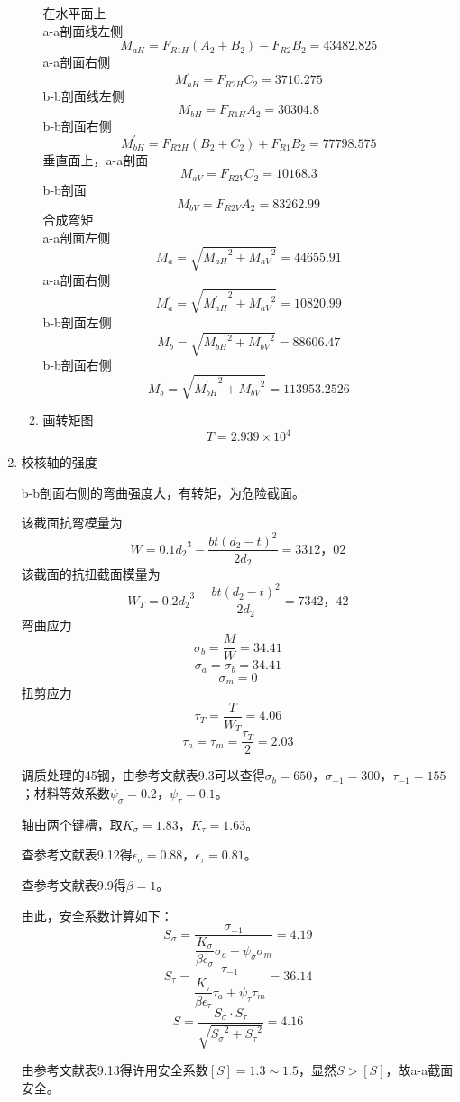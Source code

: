 \begin{enumerate}[A]
\begin{enumerate}[a]
		\par 在水平面上 \\
		a-a剖面线左侧\\
		$$M_{aH}=F_{R1H}\left(A_2+B_2\right)-F_{R2}B_2=43482.825$$
		a-a剖面右侧 \\
		$$M^{\prime}_{aH}=F_{R2H}C_2=3710.275$$
		b-b剖面线左侧\\
		$$M_{bH}=F_{R1H}A_2=30304.8$$
		b-b剖面右侧 \\
		$$M^{\prime}_{bH}=F_{R2H}\left(B_2+C_2\right)+F_{R1}B_2=77798.575$$
		垂直面上，a-a剖面
		$$M_{aV}=F_{R2V}C_2=10168.3$$
		b-b剖面
		$$M_{bV}=F_{R2V}A_2=83262.99$$
		合成弯矩\\
		a-a剖面左侧\\
		$$M_a=\sqrt{{M_{aH}}^2+{M_{aV}}^2}=44655.91$$
		a-a剖面右侧\\
		$$M^{\prime}_a=\sqrt{{M^{\prime}_{aH}}^2+{M_{aV}}^2}=10820.99$$
		b-b剖面左侧\\
		$$M_b=\sqrt{{M_{bH}}^2+{M_{bV}}^2}=88606.47$$
		b-b剖面右侧\\
		$$M^{\prime}_b=\sqrt{{M^{\prime}_{bH}}^2+{M_{bV}}^2}=113953.2526$$
		
		\item 画转矩图$$T=2.939\times 10^4$$
	\end{enumerate}
	\item 校核轴的强度
	\par b-b剖面右侧的弯曲强度大，有转矩，为危险截面。
	\par 该截面抗弯模量为
	$$W=0.1{d_2}^3-\dfrac{bt\left(d_2-t\right)^2}{2d_2}=3312，02$$
	该截面的抗扭截面模量为
	$$W_T=0.2{d_2}^3-\dfrac{bt\left(d_2-t\right)^2}{2d_2}=7342，42$$
	弯曲应力$$\sigma_b=\dfrac{M}{W}=34.41$$
	$$\sigma_a=\sigma_b=34.41$$
	$$\sigma_m=0$$
	扭剪应力
	$$\tau_T=\dfrac{T}{W_T}=4.06$$
	$$\tau_a=\tau_m=\dfrac{\tau_T}{2}=2.03$$
	\par 调质处理的45钢，由参考文献\cite{2}表9.3可以查得$\sigma_b=650$，$\sigma_{-1}=300$，$\tau_{-1}=155$；材料等效系数$\psi_\sigma=0.2$，$\psi_\tau=0.1$。
	\par 轴由两个键槽，取$K_\sigma=1.83$，$K_\tau=1.63$。
	\par 查参考文献\cite{2}表9.12得$\epsilon_\sigma=0.88$，$\epsilon_\tau=0.81$。
	\par 查参考文献\cite{2}表9.9得$\beta=1$。
	\par 由此，安全系数计算如下：
	$$S_\sigma=\dfrac{\sigma_{-1}}{\dfrac{K_\sigma}{\beta \epsilon_\sigma}\sigma_a+\psi_\sigma \sigma_m}=4.19$$
	$$S_\tau=\dfrac{\tau_{-1}}{\dfrac{K_\tau}{\beta \epsilon_\tau}\tau_a+\psi_\tau \tau_m}=36.14$$
	$$S=\dfrac{S_\sigma\cdot S_\tau}{\sqrt{{S_\sigma}^2+{S_\tau}^2}}=4.16$$
	\par 由参考文献\cite{2}表9.13得许用安全系数$\left[S\right]=1.3\sim 1.5$，显然$S>\left[S\right]$，故a-a截面安全。
	

\end{enumerate}
